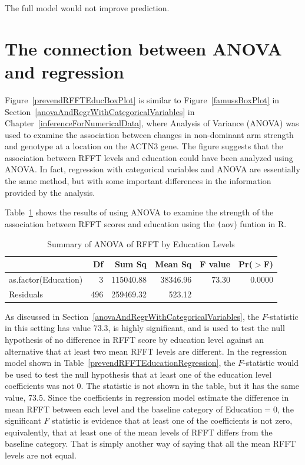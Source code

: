 The full model would not improve prediction.

\section{The connection between ANOVA and regression}
\label{ANOVAandRegression}

Figure~\ref{prevendRFFTEducBoxPlot} is similar to Figure~\ref{famussBoxPlot} in Section~\ref{anovaAndRegrWithCategoricalVariables} in Chapter~\ref{inferenceForNumericalData}, where Analysis of Variance (ANOVA) was used to examine the association between changes in non-dominant arm strength and genotype at a location on the ACTN3 gene. The figure suggests that the association between RFFT levels and education could have been analyzed using ANOVA.  In fact, regression with categorical variables and ANOVA are essentially the same method, but with some important differences in the information provided by the analysis.

Table~\ref{prevendANOVARFFTEduc} shows the results of using ANOVA to examine the strength of the association between RFFT scores and education using the \texttt(aov) funtion in \textsf{R}.

\begin{table}[ht]
\centering
\begin{tabular}{lrrrrr}
  \hline
 & Df & Sum Sq & Mean Sq & F value & Pr($>$F) \\ 
  \hline
as.factor(Education) & 3 & 115040.88 & 38346.96 & 73.30 & 0.0000 \\ 
  Residuals            & 496 & 259469.32 & 523.12 &  &  \\ 
   \hline
\end{tabular}
\caption{Summary of ANOVA of RFFT by Education Levels} 
\label{prevendANOVARFFTEduc}
\end{table}

As discussed in Section~\ref{anovaAndRegrWithCategoricalVariables}, the $F$-statistic in this setting has value 73.3, is highly significant, and is used to test the null hypothesis of no difference in RFFT score by education level against an alternative that at least two mean RFFT levels are different.  In the regression model shown in Table~\ref{prevendRFFTEducationRegression}, the $F$-statistic would be used to test the null hypothesis that at least one of the education level coefficients was not 0. The statistic is not shown in the table, but it has the same value, 73.5. Since the coefficients in regression model estimate the difference in mean RFFT between each level and the baseline category of $\text{Education} = 0$, the significant $F$ statistic is evidence that at least one of the coefficients is not zero, equivalently, that at least one of the mean levels of RFFT differs from the baseline category.  That is simply another way of saying that all the mean RFFT levels are not equal. 

